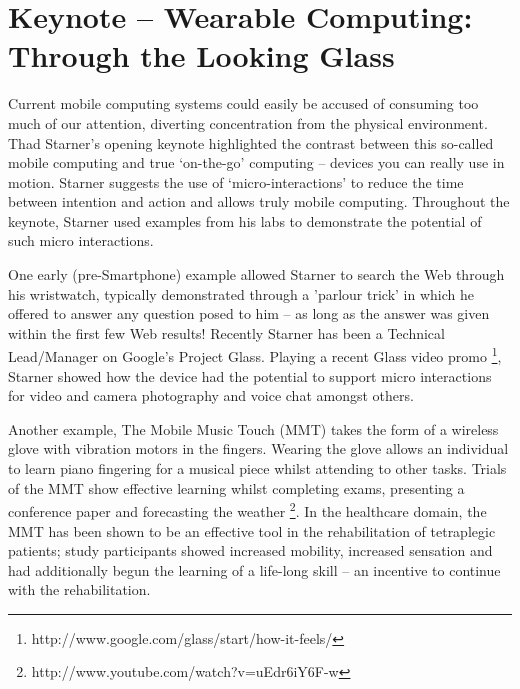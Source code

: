 \section{Keynote -- Wearable Computing: Through the Looking Glass}
\label{sec:keynote}
Current mobile computing systems could easily be accused of consuming too much
of our attention, diverting concentration from the physical environment. Thad
Starner's opening keynote highlighted the contrast between this so-called
mobile computing and true `on-the-go' computing -- devices you can really use in
motion. Starner suggests the use of `micro-interactions' to reduce the time 
between intention and action and allows truly mobile computing. Throughout the 
keynote, Starner used examples from his labs to demonstrate the potential of such 
micro interactions.


One early (pre-Smartphone) example allowed Starner to search the Web through
his wristwatch, typically demonstrated through a 'parlour trick' in which he
offered to answer any question posed to him -- as long as the answer was given
within the first few Web results!
Recently Starner has been a Technical Lead\slash Manager on Google's Project 
Glass. Playing a recent Glass video promo
\footnote{http://www.google.com/glass/start/how-it-feels/}, Starner showed how 
the device had the potential to support micro interactions for video and camera 
photography and voice chat amongst others.

Another example, The Mobile Music Touch (MMT) takes the form of a wireless glove
with vibration motors in the fingers. Wearing the glove allows an individual to
learn piano fingering for a musical piece whilst attending to other tasks.
Trials of the MMT show effective learning whilst completing exams, presenting a
conference paper and forecasting the weather
\footnote{http://www.youtube.com/watch?v=uEdr6iY6F-w}. In the healthcare domain,
the MMT has been shown to be an effective tool in the rehabilitation of
tetraplegic patients; study participants showed increased mobility, increased
sensation and had additionally begun the learning of a life-long skill -- an
incentive to continue with the rehabilitation.

